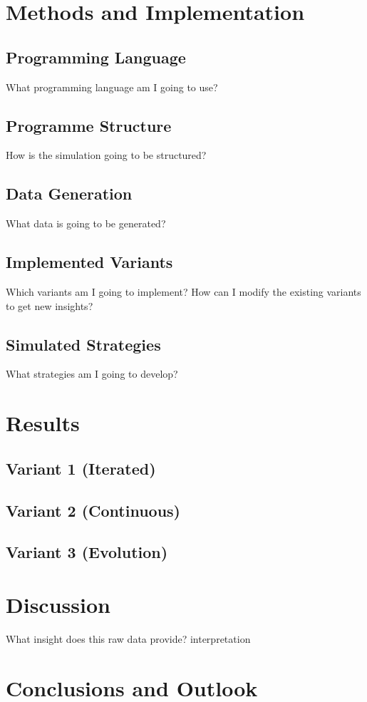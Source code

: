 \documentclass[]{article}
\begin{document}
\begin{spacing}{0.7}
\section{Methods and Implementation}
	\subsection{Programming Language}
		What programming language am I going to use?
	\subsection{Programme Structure}
		How is the simulation going to be structured?
	\subsection{Data Generation}
		What data is going to be generated?
	\subsection{Implemented Variants}
		Which variants am I going to implement?
		How can I modify the existing variants to get new insights?
	\subsection{Simulated Strategies}
		What strategies am I going to develop?
	
\section{Results}
	\subsection{Variant 1 (Iterated)}
	\subsection{Variant 2 (Continuous)}
	\subsection{Variant 3 (Evolution)}

\section{Discussion}
	What insight does this raw data provide? \rightarrow interpretation

\section{Conclusions and Outlook}

\end{spacing}
\end{document}
